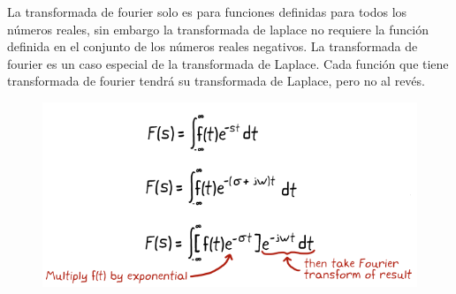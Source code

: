 \documentclass[
	12pt, %
]{fphw}
\begin{document}
La transformada de fourier solo es para funciones definidas para todos los números reales, sin embargo la transformada de laplace no requiere la función definida en el conjunto de los números reales negativos. La transformada de fourier es un caso especial de la transformada de Laplace. Cada función que tiene transformada de fourier tendrá su transformada de Laplace, pero no al revés.

\begin{figure}[H]
  \centering
  \includegraphics[scale=0.5]{images/multiply.png}
\end{figure}
\end{document}
